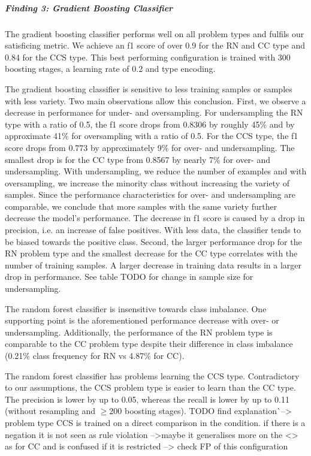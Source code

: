 \subparagraph{Finding 3: Gradient Boosting Classifier}
The gradient boosting classifier performs well on all problem types and fulfils our satisficing metric. We achieve an f1 score of over 0.9 for the RN and CC type and 0.84 for the CCS type. This best performing configuration is trained with 300 boosting stages, a learning rate of 0.2 and type encoding.


The gradient boosting classifier is sensitive to less training samples or samples with less variety. Two main observations allow this conclusion. First, we observe a decrease in performance for under- and oversampling. For undersampling the RN type with a ratio of 0.5, the f1 score drops from 0.8306 by roughly 45\% and by approximate 41\% for oversampling with a ratio of 0.5. For the CCS type, the f1 score drops from 0.773 by approximately 9\% for over- and undersampling. The smallest drop is for the CC type from 0.8567 by nearly 7\% for over- and undersampling. With undersampling, we reduce the number of examples and with oversampling, we increase the minority class without increasing the variety of samples. Since the performance characteristics for over- and undersampling are comparable, we conclude that more samples with the same variety further decrease the model's performance. The decrease in f1 score is caused by a drop in precision, i.e. an increase of false positives. With less data, the classifier tends to be biased towards the positive class.
Second, the larger performance drop for the RN problem type and the smallest decrease for the CC type correlates with the number of training samples. A larger decrease in training data results in a larger drop in performance. See table TODO for change in sample size for undersampling. 

The random forest classifier is insensitive towards class imbalance. One supporting point is the aforementioned performance decrease with over- or undersampling. Additionally, the performance of the RN problem type is comparable to the CC problem type despite their difference in class imbalance (0.21\% class frequency for RN vs 4.87\% for CC). 

The random forest classifier has problems learning the CCS type. Contradictory to our assumptions, the CCS problem type is easier to learn than the CC type. The precision is lower by up to 0.05, whereas the recall is lower by up to 0.11 (without resampling and $\geq 200$ boosting stages). TODO find explanation^^ --> problem type CCS is trained on a direct comparison in the condition. if there is a negation it is not seen as rule violation -->maybe it generalises more on the <> as for CC and is confused if it is restricted --> check FP of this configuration

